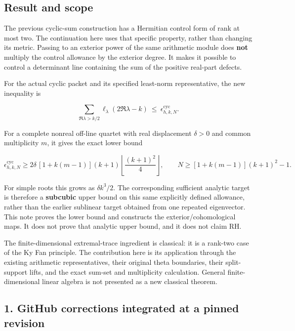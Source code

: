 



\subsection{Result and scope}\label{exterior_trace:result-and-scope}

The previous cyclic-sum construction has a Hermitian control form of
rank at most two. The continuation here uses that specific property,
rather than changing its metric. Passing to an exterior power of the
same arithmetic module does \textbf{not} multiply the control allowance
by the exterior degree. It makes it possible to control a determinant
line containing the sum of the positive real-part defects.

For the actual cyclic packet and its specified least-norm
representative, the new inequality is

\[
\boxed{
\sum_{\Re\lambda>k/2}\ell_\lambda(2\Re\lambda-k)
\ \leq\ \epsilon_{h,k,N}^{\mathrm{cyc}}.
}
\]

For a complete nonreal off-line quartet with real displacement
\(\delta>0\) and common multiplicity \(m\), it gives the exact lower
bound

\[
\boxed{
\epsilon_{h,k,N}^{\mathrm{cyc}}
\geq
2\delta\,[1+k(m-1)](k+1)
\left\lfloor\frac{(k+1)^2}{4}\right\rfloor,
\qquad
N\geq[1+k(m-1)](k+1)^2-1.
}
\]

For simple roots this grows as \(\delta k^3/2\). The corresponding
sufficient analytic target is therefore a \textbf{subcubic} upper bound
on this same explicitly defined allowance, rather than the earlier
sublinear target obtained from one repeated eigenvector. This note
proves the lower bound and constructs the exterior/cohomological maps.
It does not prove that analytic upper bound, and it does not claim RH.

The finite-dimensional extremal-trace ingredient is classical: it is a
rank-two case of the Ky Fan principle. The contribution here is its
application through the existing arithmetic representatives, their
original theta boundaries, their split-support lifts, and the exact
sum-set and multiplicity calculation. General finite-dimensional linear
algebra is not presented as a new classical theorem.

\subsection{1. GitHub corrections integrated at a pinned
revision}\label{exterior_trace:github-corrections-integrated-at-a-pinned-revision}


